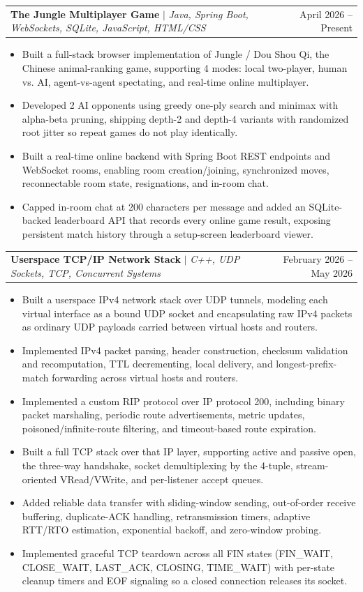 \documentclass[letterpaper,11pt]{article}
\makeatletter
\newcommand{\resumeItem}[1]{
  \item\small{
    {#1 \vspace{-2pt}}
  }
}
\newcommand{\resumeProjectHeading}[2]{
    \item
    \begin{tabular*}{0.97\textwidth}{l@{\extracolsep{\fill}}r}
      \small#1 & #2 \\
    \end{tabular*}\vspace{-7pt}
}
\newcommand{\resumeItemListStart}{\begin{itemize}}
\newcommand{\resumeItemListEnd}{\end{itemize}\vspace{-5pt}}
\makeatother
\begin{document}
      \resumeProjectHeading
          {\textbf{The Jungle Multiplayer Game} $|$ \emph{Java, Spring Boot, WebSockets, SQLite, JavaScript, HTML/CSS}}{April 2026 -- Present}
          \resumeItemListStart
            \resumeItem{Built a full-stack browser implementation of Jungle / Dou Shou Qi, the Chinese animal-ranking game, supporting 4 modes: local two-player, human vs. AI, agent-vs-agent spectating, and real-time online multiplayer.}
            \resumeItem{Developed 2 AI opponents using greedy one-ply search and minimax with alpha-beta pruning, shipping depth-2 and depth-4 variants with randomized root jitter so repeat games do not play identically.}
            \resumeItem{Built a real-time online backend with Spring Boot REST endpoints and WebSocket rooms, enabling room creation/joining, synchronized moves, reconnectable room state, resignations, and in-room chat.}
            \resumeItem{Capped in-room chat at 200 characters per message and added an SQLite-backed leaderboard API that records every online game result, exposing persistent match history through a setup-screen leaderboard viewer.}
          \resumeItemListEnd

      \resumeProjectHeading
          {\textbf{Userspace TCP/IP Network Stack} $|$ \emph{C++, UDP Sockets, TCP, Concurrent Systems}}{February 2026 -- May 2026}
          \resumeItemListStart
            \resumeItem{Built a userspace IPv4 network stack over UDP tunnels, modeling each virtual interface as a bound UDP socket and encapsulating raw IPv4 packets as ordinary UDP payloads carried between virtual hosts and routers.}
            \resumeItem{Implemented IPv4 packet parsing, header construction, checksum validation and recomputation, TTL decrementing, local delivery, and longest-prefix-match forwarding across virtual hosts and routers.}
            \resumeItem{Implemented a custom RIP protocol over IP protocol 200, including binary packet marshaling, periodic route advertisements, metric updates, poisoned/infinite-route filtering, and timeout-based route expiration.}
            \resumeItem{Built a full TCP stack over that IP layer, supporting active and passive open, the three-way handshake, socket demultiplexing by the 4-tuple, stream-oriented VRead/VWrite, and per-listener accept queues.}
            \resumeItem{Added reliable data transfer with sliding-window sending, out-of-order receive buffering, duplicate-ACK handling, retransmission timers, adaptive RTT/RTO estimation, exponential backoff, and zero-window probing.}
            \resumeItem{Implemented graceful TCP teardown across all FIN states (FIN\_WAIT, CLOSE\_WAIT, LAST\_ACK, CLOSING, TIME\_WAIT) with per-state cleanup timers and EOF signaling so a closed connection releases its socket.}
          \resumeItemListEnd
\end{document}

